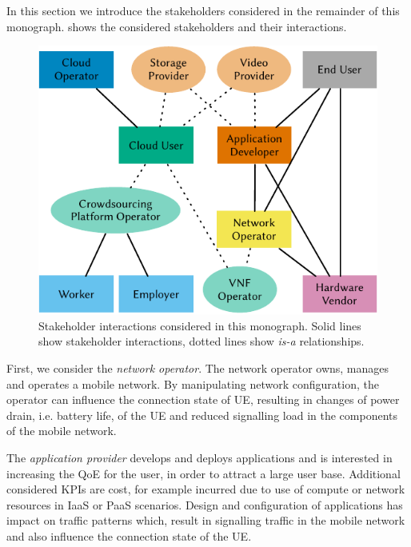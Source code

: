 In this section we introduce the stakeholders considered in the remainder of this monograph.
 shows the considered stakeholders and their interactions.

\begin{figure}
\centering
\includegraphics{figures/stakeholders}
\caption{Stakeholder interactions considered in this monograph. Solid lines show stakeholder interactions, dotted lines show \emph{is-a} relationships.}\label{fig:introduction:stakeholders}
\end{figure}

First, we consider the \emph{network operator}.
The network operator owns, manages and operates a mobile network.
By manipulating network configuration, the operator can influence the connection state of \gls{UE}, resulting in changes of power drain, i.e. battery life, of the \gls{UE} and reduced signalling load in the components of the mobile network.

The \emph{application provider} develops and deploys applications and is interested in increasing the \gls{QoE} for the user, in order to attract a large user base.
Additional considered \glspl{KPI} are cost, for example incurred due to use of compute or network resources in \gls{IaaS} or \gls{PaaS} scenarios.
Design and configuration of applications has impact on traffic patterns which, result in signalling traffic in the mobile network and also influence the connection state of the \gls{UE}.


